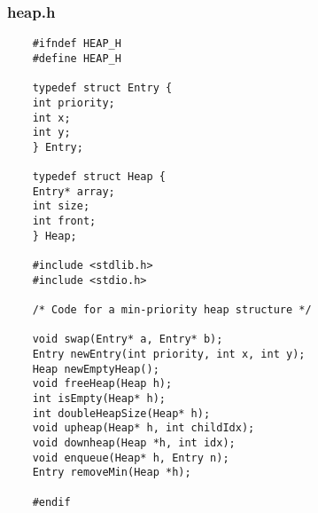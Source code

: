 \documentclass{article}
\begin{document}
	\subsubsection*{heap.h}
	\begin{lstlisting}
	#ifndef HEAP_H
	#define HEAP_H
	
	typedef struct Entry {
	int priority;
	int x;
	int y;
	} Entry;
	
	typedef struct Heap {
	Entry* array;
	int size;
	int front;
	} Heap;
	
	#include <stdlib.h>
	#include <stdio.h>
	
	/* Code for a min-priority heap structure */
	
	void swap(Entry* a, Entry* b);
	Entry newEntry(int priority, int x, int y);
	Heap newEmptyHeap();
	void freeHeap(Heap h);
	int isEmpty(Heap* h);
	int doubleHeapSize(Heap* h);
	void upheap(Heap* h, int childIdx);
	void downheap(Heap *h, int idx);
	void enqueue(Heap* h, Entry n);
	Entry removeMin(Heap *h);
	
	#endif
	\end{lstlisting}
	
\end{document}
